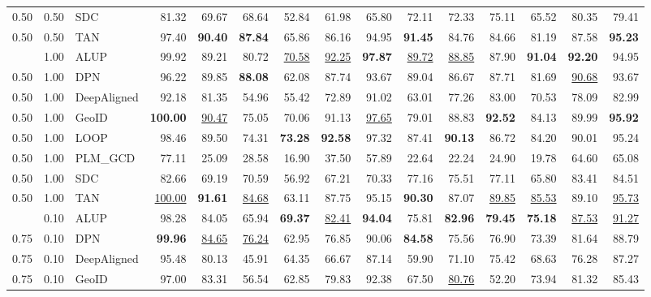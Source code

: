 \begin{table}[t]
{\begin{tabular}{lllrrrrrrrrrrrr}
0.50 & 0.50 & SDC & 81.32 & 69.67 & 68.64 & 52.84 & 61.98 & 65.80 & 72.11 & 72.33 & 75.11 & 65.52 & 80.35 & 79.41 \\
0.50 & 0.50 & TAN & 97.40 & \textbf{90.40} & \textbf{87.84} & 65.86 & 86.16 & 94.95 & \textbf{91.45} & 84.76 & 84.66 & 81.19 & 87.58 & \textbf{95.23} \\
\addlinespace
0.50 & 1.00 & ALUP & 99.92 & 89.21 & 80.72 & \underline{70.58} & \underline{92.25} & \textbf{97.87} & \underline{89.72} & \underline{88.85} & 87.90 & \textbf{91.04} & \textbf{92.20} & 94.95 \\
0.50 & 1.00 & DPN & 96.22 & 89.85 & \textbf{88.08} & 62.08 & 87.74 & 93.67 & 89.04 & 86.67 & 87.71 & 81.69 & \underline{90.68} & 93.67 \\
0.50 & 1.00 & DeepAligned & 92.18 & 81.35 & 54.96 & 55.42 & 72.89 & 91.02 & 63.01 & 77.26 & 83.00 & 70.53 & 78.09 & 82.99 \\
0.50 & 1.00 & GeoID & \textbf{100.00} & \underline{90.47} & 75.05 & 70.06 & 91.13 & \underline{97.65} & 79.01 & 88.83 & \textbf{92.52} & 84.13 & 89.99 & \textbf{95.92} \\
0.50 & 1.00 & LOOP & 98.46 & 89.50 & 74.31 & \textbf{73.28} & \textbf{92.58} & 97.32 & 87.41 & \textbf{90.13} & 86.72 & 84.20 & 90.01 & 95.24 \\
0.50 & 1.00 & PLM_GCD & 77.11 & 25.09 & 28.58 & 16.90 & 37.50 & 57.89 & 22.64 & 22.24 & 24.90 & 19.78 & 64.60 & 65.08 \\
0.50 & 1.00 & SDC & 82.66 & 69.19 & 70.59 & 56.92 & 67.21 & 70.33 & 77.16 & 75.51 & 77.11 & 65.80 & 83.41 & 84.51 \\
0.50 & 1.00 & TAN & \underline{100.00} & \textbf{91.61} & \underline{84.68} & 63.11 & 87.75 & 95.15 & \textbf{90.30} & 87.07 & \underline{89.85} & \underline{85.53} & 89.10 & \underline{95.73} \\
\addlinespace
0.75 & 0.10 & ALUP & 98.28 & 84.05 & 65.94 & \textbf{69.37} & \underline{82.41} & \textbf{94.04} & 75.81 & \textbf{82.96} & \textbf{79.45} & \textbf{75.18} & \underline{87.53} & \underline{91.27} \\
0.75 & 0.10 & DPN & \textbf{99.96} & \underline{84.65} & \underline{76.24} & 62.95 & 76.85 & 90.06 & \textbf{84.58} & 75.56 & 76.90 & 73.39 & 81.64 & 88.79 \\
0.75 & 0.10 & DeepAligned & 95.48 & 80.13 & 45.91 & 64.35 & 66.67 & 87.14 & 59.90 & 71.10 & 75.42 & 68.63 & 76.28 & 87.27 \\
0.75 & 0.10 & GeoID & 97.00 & 83.31 & 56.54 & 62.85 & 79.83 & 92.38 & 67.50 & \underline{80.76} & 52.20 & 73.94 & 81.32 & 85.43 \\

\end{tabular}}
\end{table}
